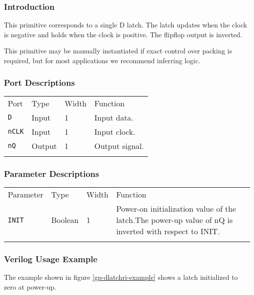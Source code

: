 \documentclass[11pt]{article}
\newcommand{\tokenstyle}[1]{\texttt{#1}}
\newcommand{\whenstyle}[1]{{\fontseries{sb}\selectfont#1}}
\newcommand{\thinhline}{\Xhline{1\arrayrulewidth}}
\newcommand{\thickhline}{\Xhline{2.5\arrayrulewidth}}
\begin{document}
\subsubsection{Introduction}
This primitive corresponds to a single D latch. The latch updates when the clock is negative and holds 
when the clock is positive. The flipflop output is inverted.

This primitive may be manually instantiated if exact control over packing is required, but for most applications we
recommend inferring logic.

\subsubsection{Port Descriptions}

\begin{tabularx}{\textwidth}{lllX}
\thinhline
\whenstyle{Port} & \whenstyle{Type} & \whenstyle{Width} & \whenstyle{Function} \\
\thickhline
\tokenstyle{D} & Input & 1 & Input data. \\
\thinhline
\tokenstyle{nCLK} & Input & 1 & Input clock. \\
\thinhline
\tokenstyle{nQ} & Output & 1 & Output signal. \\
\thinhline
\end{tabularx}

\subsubsection{Parameter Descriptions}

\begin{tabularx}{\textwidth}{lllX}
\thinhline
\whenstyle{Parameter} & \whenstyle{Type} & \whenstyle{Width} & \whenstyle{Function} \\
\thickhline
\tokenstyle{INIT} & Boolean & 1 & Power-on initialization value of the latch.\newline The power-up value of nQ is
inverted with respect to INIT.\\
\thinhline
\end{tabularx}

\subsubsection{Verilog Usage Example}

The example shown in figure \ref{gp-dlatchri-example} shows a latch initialized to zero at power-up.
\end{document}
